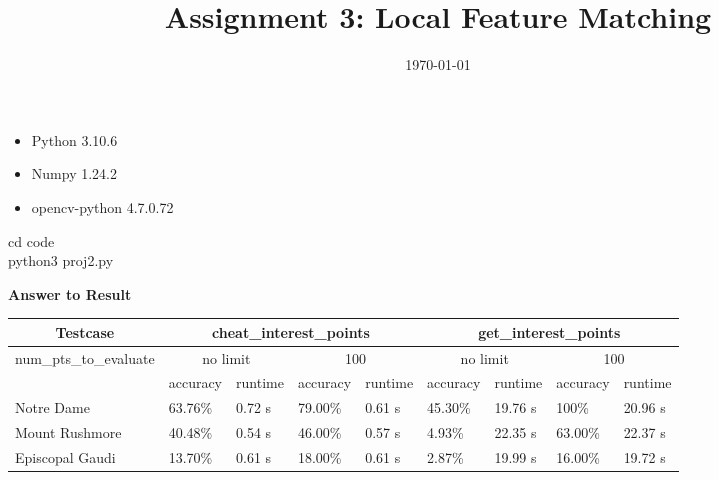 \documentclass[a4paper]{article}
\date{\today}
\title{Assignment 3: Local Feature Matching}
\begin{document}
\header{}

\begin{answer}[Environment]
    \begin{itemize}
        \item Python 3.10.6
        \item Numpy 1.24.2
        \item opencv-python 4.7.0.72
    \end{itemize}
\end{answer}

\begin{answer}[Run]
    cd code \\
    python3 proj2.py
\end{answer}

\textbf{Answer to Result}
\begin{table}[h]
    \begin{tabular}{l|llll|llll}
        \hline
        \multicolumn{1}{c|}{Testcase}           & \multicolumn{4}{c|}{cheat\_interest\_points} & \multicolumn{4}{c}{get\_interest\_points}                                                                                                    \\ \hline
        \multirow{2}{*}{num\_pts\_to\_evaluate} & \multicolumn{2}{c}{no limit}                 & \multicolumn{2}{c|}{100}                  & \multicolumn{2}{c}{no limit} & \multicolumn{2}{c}{100}                                           \\ \cline{2-9}
                                                & accuracy                                     & runtime                                   & accuracy                     & runtime                 & accuracy & runtime & accuracy & runtime \\ \hline
        Notre Dame                              & 63.76\%                                      & 0.72 s                                    & 79.00\%                      & 0.61 s                  & 45.30\%  & 19.76 s & 100\%    & 20.96 s \\
        Mount Rushmore                          & 40.48\%                                      & 0.54 s                                    & 46.00\%                      & 0.57 s                  & 4.93\%   & 22.35 s & 63.00\%  & 22.37 s \\
        Episcopal Gaudi                         & 13.70\%                                      & 0.61 s                                    & 18.00\%                      & 0.61 s                  & 2.87\%   & 19.99 s & 16.00\%  & 19.72 s \\ \hline
    \end{tabular}
\end{table}
\end{document}
